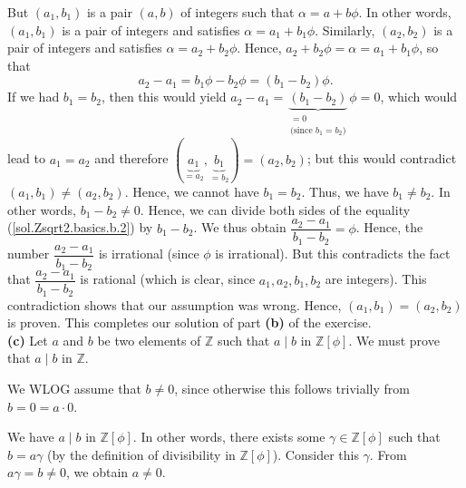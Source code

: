 \documentclass[paper=a4, fontsize=12pt]{scrartcl}%
\theoremstyle{plainsl}
\theoremstyle{definition}
\theoremstyle{remark}
\begin{document}
But $\left(  a_{1},b_{1}\right)  $ is a pair $\left(  a,b\right)  $ of
integers such that $\alpha=a+b\phi$. In other words, $\left(  a_{1}%
,b_{1}\right)  $ is a pair of integers and satisfies $\alpha=a_{1}+b_{1}\phi$.
Similarly, $\left(  a_{2},b_{2}\right)  $ is a pair of integers and satisfies
$\alpha=a_{2}+b_{2}\phi$. Hence, $a_{2}+b_{2}\phi=\alpha=a_{1}+b_{1}\phi$, so
that%
\begin{equation}
a_{2}-a_{1}=b_{1}\phi-b_{2}\phi=\left(  b_{1}-b_{2}\right)  \phi
.\label{sol.Zsqrt2.basics.b.2}%
\end{equation}
If we had $b_{1}=b_{2}$, then this would yield $a_{2}-a_{1}%
=\underbrace{\left(  b_{1}-b_{2}\right)  }_{\substack{=0\\\text{(since }%
b_{1}=b_{2}\text{)}}}\phi=0$, which would lead to $a_{1}=a_{2}$ and therefore
$\left(  \underbrace{a_{1}}_{=a_{2}},\underbrace{b_{1}}_{=b_{2}}\right)
=\left(  a_{2},b_{2}\right)  $; but this would contradict $\left(  a_{1}%
,b_{1}\right)  \neq\left(  a_{2},b_{2}\right)  $. Hence, we cannot have
$b_{1}=b_{2}$. Thus, we have $b_{1}\neq b_{2}$. In other words, $b_{1}%
-b_{2}\neq0$. Hence, we can divide both sides of the equality
(\ref{sol.Zsqrt2.basics.b.2}) by $b_{1}-b_{2}$. We thus obtain $\dfrac
{a_{2}-a_{1}}{b_{1}-b_{2}}=\phi$. Hence, the number $\dfrac{a_{2}-a_{1}}%
{b_{1}-b_{2}}$ is irrational (since $\phi$ is irrational). But this
contradicts the fact that $\dfrac{a_{2}-a_{1}}{b_{1}-b_{2}}$ is rational
(which is clear, since $a_{1},a_{2},b_{1},b_{2}$ are integers). This
contradiction shows that our assumption was wrong. Hence, $\left(  a_{1}%
,b_{1}\right)  =\left(  a_{2},b_{2}\right)  $ is proven. This completes our
solution of part \textbf{(b)} of the exercise.\\[0.4cm]

\textbf{(c)} Let $a$ and $b$ be two elements of $\mathbb{Z}$ such that $a\mid
b$ in $\mathbb{Z}\left[  \phi\right]  $. We must prove that $a\mid b$ in
$\mathbb{Z}$.

We WLOG assume that $b\neq0$, since otherwise this follows trivially from
$b=0=a\cdot0$.

We have $a\mid b$ in $\mathbb{Z}\left[  \phi\right]  $. In other words, there
exists some $\gamma\in\mathbb{Z}\left[  \phi\right]  $ such that $b=a\gamma$
(by the definition of divisibility in $\mathbb{Z}\left[  \phi\right]  $).
Consider this $\gamma$. From $a\gamma=b\neq0$, we obtain $a\neq0$.
\end{document}

